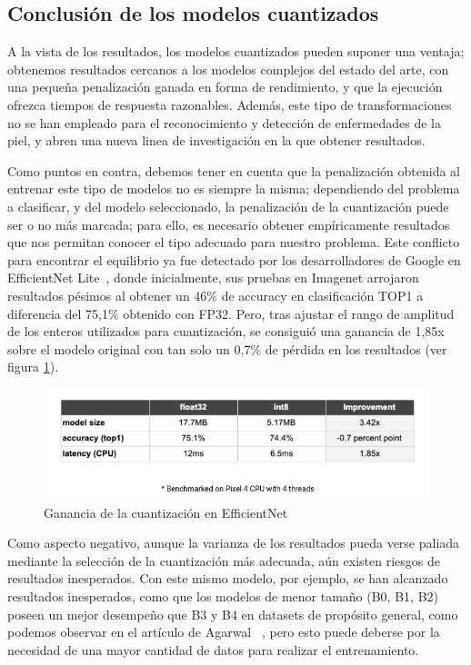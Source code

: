 \subsection{Conclusión de los modelos cuantizados}

A la vista de los resultados, los modelos cuantizados pueden suponer una ventaja; obtenemos resultados cercanos a los modelos complejos del estado del arte, con una pequeña penalización ganada en forma de rendimiento, y que la ejecución ofrezca tiempos de respuesta razonables. Además, este tipo de transformaciones no se han empleado para el reconocimiento y detección de enfermedades de la piel, y abren una nueva linea de investigación en la que obtener resultados.

Como puntos en contra, debemos tener en cuenta que la penalización obtenida al entrenar este tipo de modelos no es siempre la misma; dependiendo del problema a clasificar, y del modelo seleccionado, la penalización de la cuantización puede ser o no más marcada; para ello, es necesario obtener empíricamente resultados que nos permitan conocer el tipo adecuado para nuestro problema. Este conflicto para encontrar el equilibrio ya fue detectado por los desarrolladores de Google en EfficientNet Lite~\cite{eflite,eflite2}, donde inicialmente, sus pruebas en Imagenet arrojaron resultados pésimos al obtener un 46\% de accuracy en clasificación TOP1 a diferencia del 75,1\% obtenido con FP32. Pero, tras ajustar el rango de amplitud de los enteros utilizados para cuantización, se consiguió una ganancia de 1,85x sobre el modelo original con tan solo un 0,7\% de pérdida en los resultados (ver figura \ref{gananciacuant}).

\begin{figure}[H]

	\centering
	\includegraphics[scale = 0.425]{imagenes/gananciacuant.png}
	\caption{Ganancia de la cuantización en EfficientNet \cite{eflite2}}
	\label{gananciacuant}
\end{figure}

Como aspecto negativo, aunque la varianza de los resultados pueda verse paliada mediante la selección de la cuantización más adecuada, aún existen riesgos de resultados inesperados. Con este mismo modelo, por ejemplo, se han alcanzado resultados inesperados, como que los modelos de menor tamaño (B0, B1, B2) poseen un mejor desempeño que B3 y B4 en datasets de propósito general, como podemos observar en el artículo de Agarwal  ~\cite{efliteworse}, pero esto puede deberse por la necesidad de una mayor cantidad de datos para realizar el entrenamiento.

